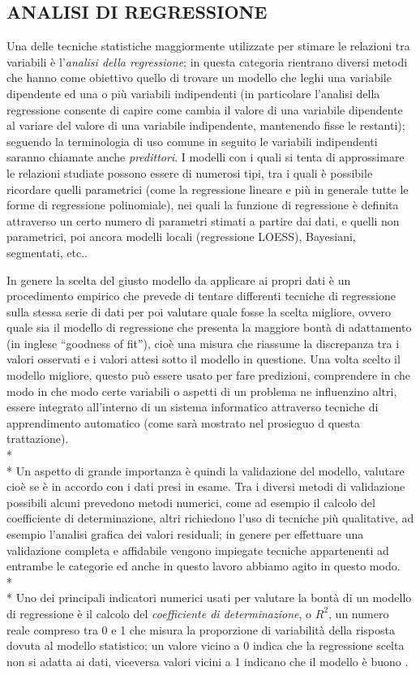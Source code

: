 \documentclass[12pt,a4paper,openright,twoside]{report}
\begin{document}
\subsection{ANALISI DI REGRESSIONE}
Una delle tecniche statistiche maggiormente utilizzate per stimare le relazioni tra variabili è l'\emph{analisi della regressione}; in questa categoria rientrano diversi metodi che hanno come obiettivo quello di trovare un modello che leghi una variabile dipendente ed una o più variabili indipendenti (in particolare l'analisi della regressione consente di capire come cambia il valore di una variabile dipendente al variare del valore di una variabile indipendente, mantenendo fisse le restanti); seguendo la terminologia di uso comune in seguito le variabili indipendenti saranno chiamate anche \emph{predittori}.  
I modelli con i quali si tenta di approssimare le relazioni studiate possono essere di numerosi tipi, tra i quali è possibile ricordare quelli parametrici (come la regressione lineare e più in generale tutte le forme di regressione polinomiale), nei quali la funzione di regressione è definita attraverso un certo numero di parametri stimati a partire dai dati, e quelli non parametrici, poi ancora modelli locali (regressione LOESS), Bayesiani, segmentati, etc..

In genere la scelta del giusto modello da applicare ai propri dati è un procedimento empirico che prevede di tentare differenti tecniche di regressione sulla stessa serie di dati per poi valutare quale fosse la scelta migliore, ovvero quale sia il modello di regressione che presenta la maggiore bontà di adattamento (in inglese ``goodness of fit''), cioè una misura che riassume la discrepanza tra i valori osservati e i valori attesi sotto il modello in questione. 
Una volta scelto il modello migliore, questo può essere usato per fare predizioni, comprendere in che modo in che modo certe variabili o aspetti di un problema ne influenzino altri, essere integrato all'interno di un sistema informatico attraverso tecniche di apprendimento automatico (come sarà mostrato nel prosieguo d questa trattazione). 
\\*\\*
Un aspetto di grande importanza è quindi la validazione del modello, valutare cioè se è in accordo con i dati presi in esame. Tra i diversi metodi di validazione possibili alcuni prevedono metodi numerici, come ad esempio il calcolo del coefficiente di determinazione, altri richiedono l'uso di tecniche più qualitative, ad esempio l'analisi grafica dei valori residuali; in genere per effettuare una validazione completa e affidabile vengono impiegate tecniche appartenenti ad entrambe le categorie ed anche in questo lavoro abbiamo agito in questo modo.\\*\\*
Uno dei principali indicatori numerici usati per valutare la bontà di un modello di regressione è il calcolo del \emph{coefficiente di determinazione}, o $R^2$, un numero reale compreso tra 0 e 1 che misura la proporzione di variabilità della risposta dovuta al modello statistico; un valore vicino a 0 indica che la regressione scelta non si adatta ai dati, viceversa valori vicini a 1 indicano che il modello è buono \cite{principleStats,regressionAnalysis}. 
\end{document}
